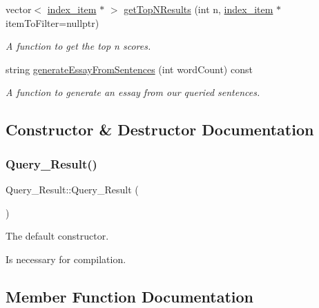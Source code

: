 \begin{DoxyCompactItemize}
vector$<$ \hyperlink{classindex__item}{index\+\_\+item} $\ast$ $>$ \hyperlink{class_query___result_a05014e96b4883c7ca78c7bd3b2e457d8}{get\+Top\+N\+Results} (int n, \hyperlink{classindex__item}{index\+\_\+item} $\ast$item\+To\+Filter=nullptr)
\begin{DoxyCompactList}\small\item\em A function to get the top n scores. \end{DoxyCompactList}\item 
string \hyperlink{class_query___result_a4729716b1a3d34c761a56d4d96ff906f}{generate\+Essay\+From\+Sentences} (int word\+Count) const
\begin{DoxyCompactList}\small\item\em A function to generate an essay from our queried sentences. \end{DoxyCompactList}\end{DoxyCompactItemize}


\subsection{Constructor \& Destructor Documentation}
\mbox{\label{class_query___result_aca6caea4d2be58145212fc22c56a5fab}} 
\subsubsection{\texorpdfstring{Query\+\_\+\+Result()}{Query\_Result()}}
{\footnotesize\ttfamily Query\+\_\+\+Result\+::\+Query\+\_\+\+Result (\begin{DoxyParamCaption}{ }\end{DoxyParamCaption})}



The default constructor. 

Is necessary for compilation. 

\subsection{Member Function Documentation}
\mbox{\label{class_query___result_a4729716b1a3d34c761a56d4d96ff906f}} 
